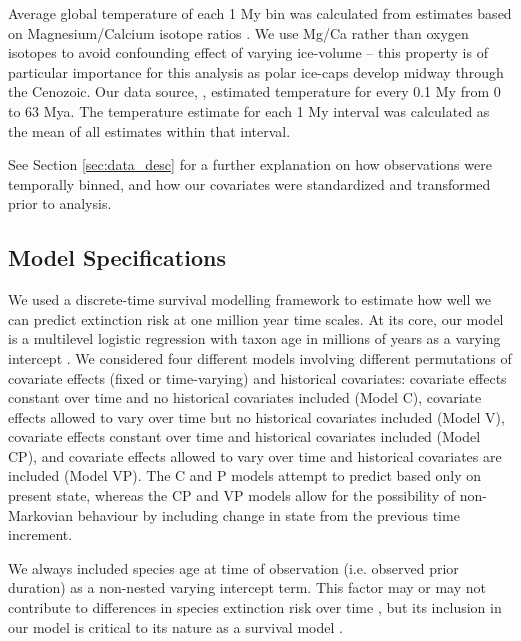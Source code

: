 \documentclass[12pt,letterpaper]{article}
\begin{document}
\begin{refsection}
Average global temperature of each 1 My bin was calculated from estimates based on Magnesium/Calcium isotope ratios \citet{Cramer2011}. We use Mg/Ca rather than oxygen isotopes to avoid confounding effect of varying ice-volume -- this property is of particular importance for this analysis as polar ice-caps develop midway through the Cenozoic. Our data source, \citet{Cramer2011}, estimated temperature for every 0.1 My from 0 to 63 Mya. The temperature estimate for each 1 My interval was calculated as the mean of all estimates within that interval. 

See Section \ref{sec:data_desc} for a further explanation on how observations were temporally binned, and how our covariates were standardized and transformed prior to analysis.




\subsection{Model Specifications}

We used a discrete-time survival modelling framework to estimate how well we can predict extinction risk at one million year time scales. At its core, our model is a multilevel logistic regression with taxon age in millions of years as a varying intercept \citep{Tutz2016}. We considered four different models involving different permutations of covariate effects (fixed or time-varying) and historical covariates: covariate effects constant over time and no historical covariates included (Model C), covariate effects allowed to vary over time but no historical covariates included (Model V), covariate effects constant over time and historical covariates included (Model CP), and covariate effects allowed to vary over time and historical covariates are included (Model VP). The C and P models attempt to predict based only on present state, whereas the CP and VP models allow for the possibility of non-Markovian behaviour by including change in state from the previous time increment.

We always included species age at time of observation (i.e. observed prior duration) as a non-nested varying intercept term. This factor may or may not contribute to differences in species extinction risk over time \citep{Smits2015,Finnegan2008,Ezard2012,VanValen1973,Liow2011,Crampton2016}, but its inclusion in our model is critical to its nature as a survival model \cite{Tutz2016}.


\end{refsection}
\end{document}
